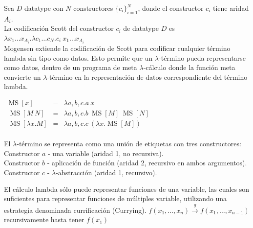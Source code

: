 \begin{defn}\end{defn}
Sea $D$ datatype con $N$ constructores $\{c_i\}_{i=1}^N$, donde el constructor $c_i$ tiene aridad $A_i$. \\
La codificación Scott del constructor $c_i$ de datatype $D$ es\\
$\lambda x_1 \dots x_{A_i} . \lambda c_1 \ldots c_N . c_i\ x_1 \dots x_{A_i}$\\
Mogensen extiende la codificación de Scott \cite{Mog1994} para codificar cualquier término lambda sin tipo como datos. Esto permite que un $\lambda$-término pueda representarse como datos, dentro de un programa de meta $\lambda$-cálculo donde la función meta convierte un $\lambda$-término en la representación de datos correspondiente del término lambda.\\
\begin{center}
$\begin{array}{rcl}
\operatorname{MS}[x] & = & \lambda a, b, c.a\ x \\
\ \operatorname{MS}[M\ N] & = & \lambda a, b, c.b\ \operatorname{MS}[M]\ \operatorname{MS}[N] \\
\ \operatorname{MS}[\lambda x . M] & = & \lambda a, b, c.c\ (\lambda x.\operatorname{MS}[M]) \\
\end{array}$\vspace{0.2cm} \\
\end{center}
El $\lambda$-término se representa como una unión de etiquetas con tres constructores:\\
Constructor $a$ - una variable (aridad 1, no recursiva).\\
Constructor $b$ - aplicación de función (aridad 2, recursivo en ambos argumentos).\\
Constructor $c$ - $\lambda$-abstracción (aridad 1, recursivo).


\begin{note}
El cálculo lambda sólo puede representar funciones de una variable, 
las cuales son suficientes para representar funciones de múltiples variable, utilizando una estrategia denominada currificación (Currying).
$\displaystyle f(x_{1}, \dots, x_n) \xrightarrow{g} f(x_1, \dots, x_{n-1})$ recursivamente hasta tener $f(x_1)$
\end{note}

